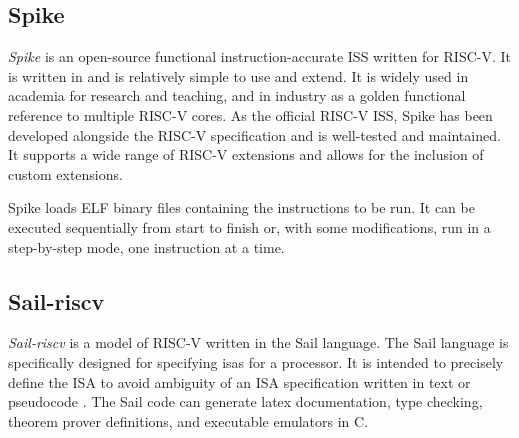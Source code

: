 \subsection{Spike}
\label{sec:spike}

\textit{Spike} \cite{SpikeRISCVISA2023} is an open-source functional instruction-accurate ISS written for RISC-V. It is written in \cpp and is relatively simple to use and extend. It is widely used in academia for research and teaching, and in industry as a golden functional reference to multiple RISC-V cores. As the official RISC-V ISS, Spike has been developed alongside the RISC-V specification and is well-tested and maintained. It supports a wide range of RISC-V extensions and allows for the inclusion of custom extensions.

Spike loads ELF binary files containing the instructions to be run. It can be executed sequentially from start to finish or, with some modifications, run in a step-by-step mode, one instruction at a time. 







\subsection{Sail-riscv}
\label{sec:sail}

\textit{Sail-riscv} \cite{RISCVSailModel2023} is a model of RISC-V written in the Sail language. The Sail language is specifically designed for specifying \acrshort{isa}s for a processor. It is intended to precisely define the ISA to avoid ambiguity of an ISA specification written in text or pseudocode \cite{armstrongSailInstructionsetSemantics2023}. The Sail code can generate latex documentation, type checking, theorem prover definitions, and executable emulators in C.  

